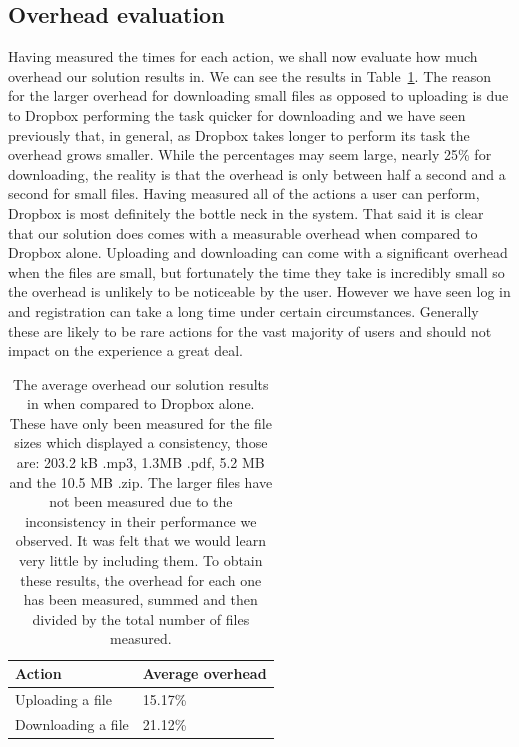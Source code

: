 \documentclass[12pt, titlepage]{article}
\begin{document}
\subsection{Overhead evaluation}
Having measured the times for each action, we shall now evaluate how much overhead our solution results in. We can see the results in Table~\ref{tab:overhead}. The reason for the larger overhead for downloading small files as opposed to uploading is due to Dropbox performing the task quicker for downloading and we have seen previously that, in general, as Dropbox takes longer to perform its task the overhead grows smaller. While the percentages may seem large, nearly 25\% for downloading, the reality is that the overhead is only between half a second and a second for small files.
\newline \indent Having measured all of the actions a user can perform, Dropbox is most definitely the bottle neck in the system. That said it is clear that our solution does comes with a measurable overhead when compared to Dropbox alone. Uploading and downloading can come with a significant overhead when the files are small, but fortunately the time they take is incredibly small so the overhead is unlikely to be noticeable by the user. However we have seen log in and registration can take a long time under certain circumstances. Generally these are likely to be rare actions for the vast majority of users and should not impact on the experience a great deal.

\begin{table}[H]
	\begin{center}
    	\begin{tabular}{ | l | l |}
    \hline
     \textbf{Action} & \textbf{Average overhead} \\ \hline
      Uploading a file & 15.17\% \\ \hline
      Downloading a file & 21.12\%	\\ \hline    
    \end{tabular}
    \caption{The average overhead our solution results in when compared to Dropbox alone. These have only been measured for the file sizes which displayed a consistency, those are: 203.2 kB .mp3, 1.3MB .pdf, 5.2 MB and the 10.5 MB .zip. The larger files have not been measured due to the inconsistency in their performance we observed. It was felt that we would learn very little by including them.
\newline \indent To obtain these results, the overhead for each one has been measured, summed and then divided by the total number of files measured.}
    \label{tab:overhead}
   \end{center}
\end{table}
\end{document}
